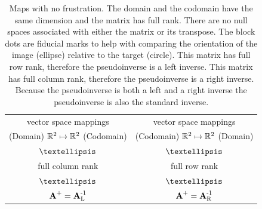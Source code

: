 \begin{table}[htdp]
\begin{center}
\begin{tabular}{cc}
vector space mappings & vector space mappings\\
(Domain) $\mathbb{R}^{2} \mapsto \mathbb{R}^{2}$ (Codomain) & (Codomain) $\mathbb{R}^{2} \mapsto \mathbb{R}^{2}$ (Domain)\\
 $\textellipsis$ & $\textellipsis$ \\
 full column rank  & full row rank\\
  $\textellipsis$ & $\textellipsis$ \\
 $\operatorname{\textbf{A}^{\mathrm{+}}}=\operatorname{\textbf{A}^{\mathrm{-1}}_{\mathrm{L}}}$ & $\operatorname{\textbf{A}^{\mathrm{+}}}=\operatorname{\textbf{A}^{\mathrm{-1}}_{\mathrm{R}}}$\\[10pt]
\end{tabular}
\end{center}
\label{tab:interpII:a}
\caption{Maps with no frustration. The domain and the codomain have the same dimension and the matrix has full rank. There are no null spaces associated with either the matrix or its transpose. The block dots are fiducial marks to help with comparing the orientation of the image (ellipse) relative to the target (circle). This matrix has full row rank, therefore the pseudoinverse is a left inverse. This matrix has full column rank, therefore the pseudoinverse is a right inverse. Because the pseudoinverse is both a left and a right inverse the pseudoinverse is also the standard inverse.}
\end{table}%

